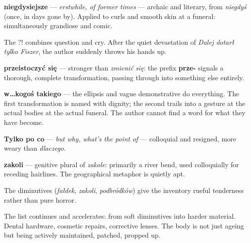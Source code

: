 \textbf{niegdysiejsze} --- \textit{erstwhile, of former times} --- archaic and 
literary, from \textit{niegdyś} (once, in days gone by). Applied to curls and 
smooth skin at a funeral: simultaneously grandiose and comic.

The ?! combines question and cry. After the quiet devastation of 
\textit{Dalej dotarł tylko Fiszer}, the author suddenly throws his hands up.



\textbf{przeistoczyć się} --- stronger than \textit{zmienić się}: the prefix 
\textbf{prze-} signals a thorough, complete transformation, passing through 
into something else entirely.

\textbf{w\ldots kogoś takiego} --- the ellipsis and vague demonstrative do 
everything. The first transformation is named with dignity; the second trails 
into a gesture at the actual bodies at the actual funeral. The author cannot 
find a word for what they have become.



\textbf{Tylko po co} --- \textit{but why, what's the point of} --- colloquial 
and resigned, more weary than \textit{dlaczego}.

\textbf{zakoli} --- genitive plural of \textit{zakole}: primarily a river bend, 
used colloquially for receding hairlines. The geographical metaphor is quietly apt.

The diminutives (\textit{fałdek}, \textit{zakoli}, \textit{podbródków}) give 
the inventory rueful tenderness rather than pure horror.



The list continues and accelerates: from soft diminutives into harder material. 
Dental hardware, cosmetic repairs, corrective lenses. The body is not just 
ageing but being actively maintained, patched, propped up.

